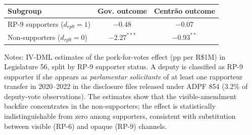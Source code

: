 \begin{table}[htbp]
\centering
\caption{}
\label{tab:t2_dual}
\begin{threeparttable}
\small
\begin{tabular}{lcc}
\toprule
Subgroup & Gov. outcome & Centrão outcome \\
\midrule
RP-9 supporters ($d_{rp9}=1$) & $-0.48$ & $-0.07$ \\
Non-supporters ($d_{rp9}=0$) & $-2.27^{***}$ & $-0.93^{**}$ \\
\bottomrule
\end{tabular}
\begin{tablenotes}
\small
\item Notes: IV-DML estimates of the pork-for-votes effect (pp per R\$1M) in Legislature 56, split by RP-9 supporter status. A deputy is classified as RP-9 supporter if she appears as \emph{parlamentar solicitante} of at least one rapporteur transfer in 2020--2022 in the disclosure files released under ADPF 854 (3.2\% of deputy-vote observations). The estimates show that the visible-amendment backfire concentrates in the non-supporters; the effect is statistically indistinguishable from zero among supporters, consistent with substitution between visible (RP-6) and opaque (RP-9) channels.
\end{tablenotes}
\end{threeparttable}
\end{table}